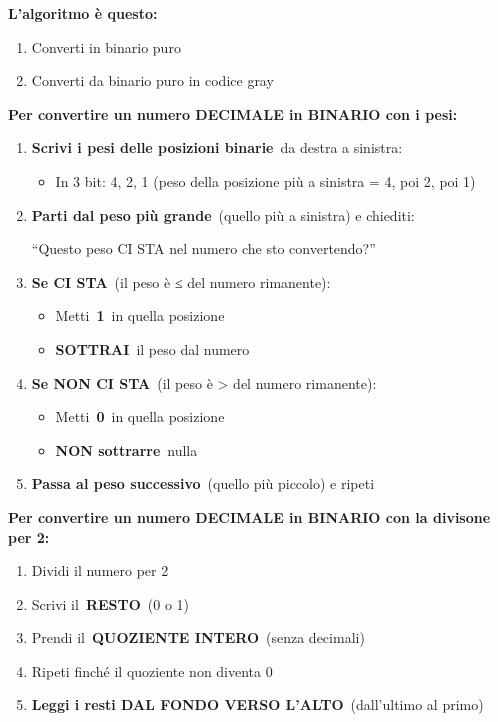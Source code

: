 \documentclass[
]{article}
\providecommand{\tightlist}{%
  \setlength{\itemsep}{0pt}\setlength{\parskip}{0pt}}
\begin{document}
\textbf{L'algoritmo è questo:}

\begin{enumerate}
\def\labelenumi{\arabic{enumi}.}
\tightlist
\item
  Converti in binario puro
\item
  Converti da binario puro in codice gray
\end{enumerate}

\textbf{Per convertire un numero DECIMALE in BINARIO con i pesi:}

\begin{enumerate}
\def\labelenumi{\arabic{enumi}.}
\item
  \textbf{Scrivi i pesi delle posizioni binarie}~da destra a sinistra:

  \begin{itemize}
  \tightlist
  \item
    In 3 bit: 4, 2, 1 (peso della posizione più a sinistra = 4, poi 2, poi 1)
  \end{itemize}
\item
  \textbf{Parti dal peso più grande}~(quello più a sinistra) e chiediti:

  ``Questo peso CI STA nel numero che sto convertendo?''
\item
  \textbf{Se CI STA}~(il peso è ≤ del numero rimanente):

  \begin{itemize}
  \tightlist
  \item
    Metti~\textbf{1}~in quella posizione
  \item
    \textbf{SOTTRAI}~il peso dal numero
  \end{itemize}
\item
  \textbf{Se NON CI STA}~(il peso è \textgreater{} del numero rimanente):

  \begin{itemize}
  \tightlist
  \item
    Metti~\textbf{0}~in quella posizione
  \item
    \textbf{NON sottrarre}~nulla
  \end{itemize}
\item
  \textbf{Passa al peso successivo}~(quello più piccolo) e ripeti
\end{enumerate}

\textbf{Per convertire un numero DECIMALE in BINARIO con la divisone per 2:}

\begin{enumerate}
\def\labelenumi{\arabic{enumi}.}
\tightlist
\item
  Dividi il numero per 2
\item
  Scrivi il~\textbf{RESTO}~(0 o 1)
\item
  Prendi il~\textbf{QUOZIENTE INTERO}~(senza decimali)
\item
  Ripeti finché il quoziente non diventa 0
\item
  \textbf{Leggi i resti DAL FONDO VERSO L'ALTO}~(dall'ultimo al primo)
\end{enumerate}
\end{document}
